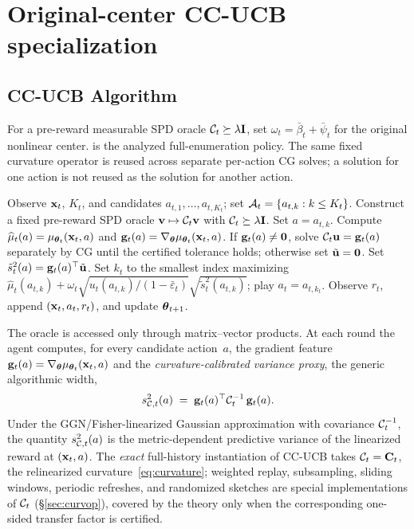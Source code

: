 \section{Original-center CC-UCB specialization}\label{sec:method}

\subsection{CC-UCB Algorithm}

For a pre-reward measurable SPD oracle $\mathcal{C}_t\succeq\lambda\mathbf{I}$, set
$\omega_t=\bar\beta_t+\bar\psi_t$ for the original nonlinear center.
 is the analyzed full-enumeration policy.  The same fixed
curvature operator is reused across separate per-action CG solves; a solution
for one action is not reused as the solution for another action.
\begin{algorithm}[H]
\caption{Curvature-Calibrated UCB (CC-UCB)}\label{alg:ccucb}
\begin{algorithmic}[1]
\STATE Observe $\mathbf{x}_t$, $K_t$, and candidates
$a_{t,1},\ldots,a_{t,K_t}$; set $\mathcal{A}_t=\{a_{t,k}:k\le K_t\}$.
\STATE Construct a fixed pre-reward SPD oracle $\mathbf{v}\mapsto\mathcal{C}_t\mathbf{v}$ with $\mathcal{C}_t\succeq\lambda\mathbf{I}$.
  \STATE Set $a=a_{t,k}$.
  \STATE Compute $\widehat\mu_t(a)=\mu_{\boldsymbol{\theta}_t}(\mathbf{x}_t,a)$ and $\mathbf{g}_t(a)=\nabla_{\boldsymbol{\theta}}\mu_{\boldsymbol{\theta}_t}(\mathbf{x}_t,a)$.
  \STATE If $\mathbf{g}_t(a)\ne\mathbf0$, solve $\mathcal{C}_t\mathbf{u}=\mathbf{g}_t(a)$ separately by CG until the certified tolerance holds; otherwise set $\tilde{\mathbf{u}}=\mathbf0$. \label{line:cg}
  \STATE Set $\tilde s_t^2(a)=\mathbf{g}_t(a)^\top\tilde{\mathbf{u}}$.
\ENDFOR
\STATE Set $k_t$ to the smallest index maximizing
$\widehat\mu_t(a_{t,k})+\omega_t\sqrt{u_t(a_{t,k})/(1-\bar\varepsilon_t)}
\sqrt{\tilde s_t^2(a_{t,k})}$; play $a_t=a_{t,k_t}$. \label{line:ucb}
\STATE Observe $r_t$, append $(\mathbf{x}_t,a_t,r_t)$, and update $\boldsymbol{\theta}_{t+1}$.
\end{algorithmic}
\end{algorithm}

The oracle is accessed only through matrix--vector products.  At each round the
agent computes,
for every candidate action~$a$, the gradient feature
$\mathbf{g}_t(a)=\nabla_{\boldsymbol{\theta}}\mu_{\boldsymbol{\theta}_t}(\mathbf{x}_t,a)$ and the
\emph{curvature-calibrated variance proxy}, the generic algorithmic width,
\begin{equation}\label{eq:variance}
  s_{\mathcal{C},t}^2(a)
  \;=\;
  \mathbf{g}_t(a)^\top\mathcal{C}_t^{-1}\,\mathbf{g}_t(a).
\end{equation}
Under the GGN/Fisher-linearized Gaussian approximation with covariance
$\mathcal{C}_t^{-1}$, the quantity $s_{\mathcal{C},t}^2(a)$ is the metric-dependent
predictive variance of the linearized reward at $(\mathbf{x}_t,a)$.
The \emph{exact} full-history instantiation of CC-UCB takes $\mathcal{C}_t=\mathbf{C}_t$, the
relinearized curvature~\eqref{eq:curvature}; weighted replay, subsampling,
sliding windows, periodic refreshes, and randomized sketches are special
implementations of $\mathcal{C}_t$ (\S\ref{sec:curvop}), covered by the theory only
when the corresponding one-sided transfer factor is certified.

